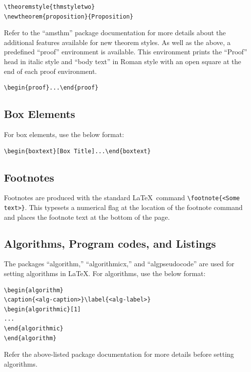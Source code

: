 \documentclass{article}
\begin{document}
\begin{verbatim}
\theoremstyle{thmstyletwo}
\newtheorem{proposition}{Proposition}
\end{verbatim}

Refer to the ``amsthm'' package documentation for more details about the additional features available for new theorem styles. As well as the above, a predefined ``proof'' environment is available. This environment prints the ``Proof'' head in italic style and ``body text'' in Roman style with an open square at the end of each proof environment.

\begin{verbatim}
\begin{proof}...\end{proof}
\end{verbatim}

\subsection{Box Elements}

For box elements, use the below format: 

\begin{verbatim}
\begin{boxtext}[Box Title]...\end{boxtext}
\end{verbatim}

\subsection{Footnotes}

Footnotes are produced with the standard \LaTeX\ command \verb+\footnote{<Some text>}+. This typesets a numerical flag at the location of the footnote command and places the footnote text at the bottom of the page.

\subsection{Algorithms, Program codes, and Listings}

The packages ``algorithm,'' ``algorithmicx,'' and ``algpseudocode'' are used for setting algorithms in \LaTeX. For algorithms, use the below format:

\begin{verbatim}
\begin{algorithm}
\caption{<alg-caption>}\label{<alg-label>}
\begin{algorithmic}[1]
...
\end{algorithmic}
\end{algorithm}
\end{verbatim}
Refer the above-listed package documentation for more details before setting algorithms.
\end{document}
